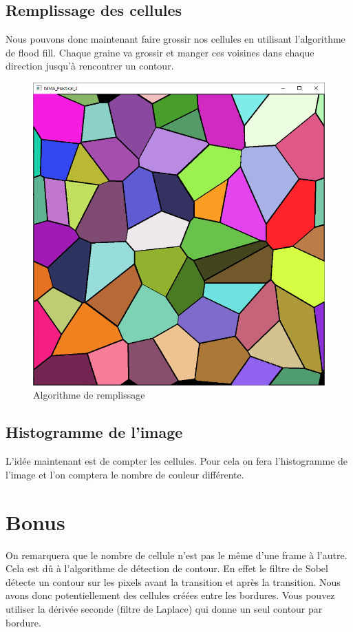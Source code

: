 \documentclass{article}
\begin{document}
\subsection{Remplissage des cellules}
Nous pouvons donc maintenant faire grossir nos cellules en utilisant l'algorithme de flood fill. Chaque graine va grossir et manger ces voisines dans chaque direction jusqu'à rencontrer un contour.
\begin{figure}[H]
	\centering
	\includegraphics[scale=0.4]{images/flood_fill.png}
	\caption{Algorithme de remplissage}
\end{figure}

\subsection{Histogramme de l'image}
L'idée maintenant est de compter les cellules. Pour cela on fera l'histogramme de l'image et l'on comptera le nombre de couleur différente.

\section{Bonus}
On remarquera que le nombre de cellule n'est pas le même d'une frame à l'autre. Cela est dû à l'algorithme de détection de contour. En effet le filtre de Sobel détecte un contour sur les pixels avant la transition et après la transition. Nous avons donc potentiellement des cellules créées entre les bordures. Vous pouvez utiliser la dérivée seconde (filtre de Laplace) qui donne un seul contour par bordure.
\end{document}
